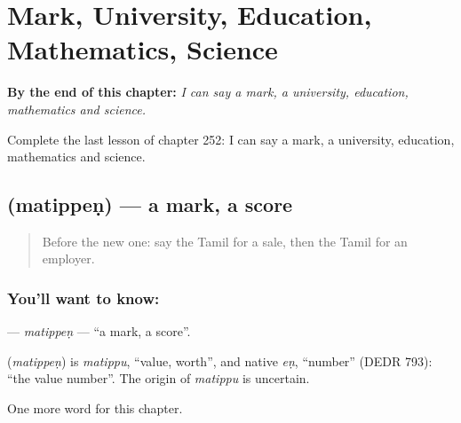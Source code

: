 
\chapter{Mark, University, Education, Mathematics, Science}
\label{ch:ta-mark-university-education-mathematics-science}

\begin{chapteropening}
\textbf{By the end of this chapter:} \emph{I can say a mark, a university, education, mathematics and science.}

Complete the last lesson of chapter 252: I can say a mark, a university, education, mathematics and science.
\end{chapteropening}

\section[\texorpdfstring{\ta{மதிப்பெண்} (matippeṇ)}{மதிப்பெண் (matippeṇ)}]{ (matippeṇ) — a mark, a score}

\label{lesson:TA-C252-matippen}



\begin{quote}
Before the new one: say the Tamil for a sale, then the Tamil for an employer.
\end{quote}

\subsection*{You'll want to know: }
\textbf{} — \emph{matippeṇ} — \textquotedblleft{}a mark, a score\textquotedblright{}.

\begin{cousinweb}
\textbf{} (\emph{matippeṇ}) is \emph{matippu}, \textquotedblleft{}value, worth\textquotedblright{}, and native \emph{eṇ}, \textquotedblleft{}number\textquotedblright{} (DEDR 793): \textquotedblleft{}the value number\textquotedblright{}. The origin of \emph{matippu} is uncertain.
\end{cousinweb}

\begin{grammarlens}[title={What you've built}]
One more word for this chapter.
\end{grammarlens}

